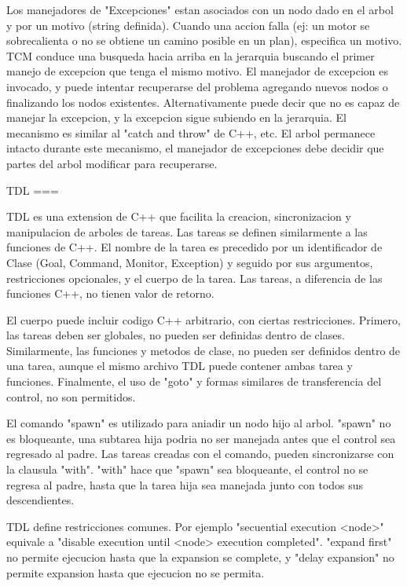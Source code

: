 \documentclass{article}
\begin{document}
Los manejadores de "Excepciones" estan asociados con un nodo dado en el arbol 
y por un motivo (string definida).
Cuando una accion falla (ej: un motor se sobrecalienta o no se obtiene un 
camino posible en un plan), especifica 
un motivo.
TCM conduce una busqueda hacia arriba en la jerarquia buscando el primer 
manejo de excepcion que tenga el mismo motivo.
El manejador de excepcion es invocado, y puede intentar recuperarse del 
problema agregando nuevos nodos o finalizando los nodos
existentes.
Alternativamente puede decir que no es capaz de manejar la excepcion, y la 
excepcion sigue subiendo en la jerarquia.
El mecanismo es similar al "catch and throw" de C++, etc.
El arbol permanece intacto durante este mecanismo, el manejador de excepciones 
debe decidir que partes del arbol modificar para recuperarse.


TDL
===

TDL es una extension de C++ que facilita la creacion, sincronizacion y 
manipulacion de arboles de tareas.
Las tareas se definen similarmente a las funciones de C++.
El nombre de la tarea es precedido por un identificador de Clase (Goal, 
Command, Monitor, Exception) y seguido por sus argumentos,
restricciones opcionales, y el cuerpo de la tarea.
Las tareas, a diferencia de las funciones C++, no tienen valor de retorno.

El cuerpo puede incluir codigo C++ arbitrario, con ciertas restricciones.
Primero, las tareas deben ser globales, no pueden ser definidas dentro de 
clases. Similarmente, las funciones
y metodos de clase, no pueden ser definidos dentro de una tarea, aunque el 
mismo archivo TDL puede contener ambas tarea y funciones.
Finalmente, el uso de "goto" y formas similares de transferencia del control, 
no son permitidos.

El comando "spawn" es utilizado para aniadir un nodo hijo al arbol. "spawn" 
no es bloqueante, una subtarea hija podria no ser
manejada antes que el control sea regresado al padre.
Las tareas creadas con el comando, pueden sincronizarse con la clausula "with".
 "with" hace que "spawn" sea bloqueante,
el control no se regresa al padre, hasta que la tarea hija sea manejada junto 
con todos sus descendientes.

TDL define restricciones comunes. Por ejemplo "secuential execution <node>"
equivale a "disable execution until <node> execution completed".
"expand first" no permite ejecucion hasta que la expansion se complete, y 
"delay expansion" no permite expansion hasta que ejecucion no se permita.
\end{document}
